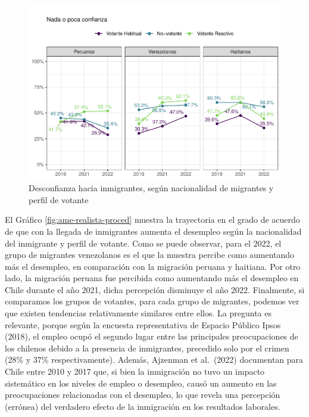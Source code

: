 \documentclass[
  12pt,
]{book}
\begin{document}
\begin{figure}

{\centering \includegraphics{reporte-elsoc_files/figure-latex/desconf-inmigrante-1} 

}

\caption{Desconfianza hacia inmigrantes, según nacionalidad de migrantes y perfil de votante}\label{fig:desconf-inmigrante}
\end{figure}

El Gráfico \ref{fig:ame-realista-proced} muestra la trayectoria en el grado de acuerdo de que con la llegada de inmigrantes aumenta el desempleo según la nacionalidad del inmigrante y perfil de votante. Como se puede observar, para el 2022, el grupo de migrantes venezolanos es el que la muestra percibe como aumentando más el desempleo, en comparación con la migración peruana y haitiana. Por otro lado, la migración peruana fue percibida como aumentando más el desempleo en Chile durante el año 2021, dicha percepción disminuye el año 2022. Finalmente, si comparamos los grupos de votantes, para cada grupo de migrantes, podemos ver que existen tendencias relativamente similares entre ellos. La pregunta es relevante, porque según la encuesta representativa de Espacio Público Ipsos (2018), el empleo ocupó el segundo lugar entre las principales preocupaciones de los chilenos debido a la presencia de inmigrantes, precedido solo por el crimen (28\% y 37\% respectivamente). Además, Ajzenman et al.~(2022) documentan para Chile entre 2010 y 2017 que, si bien la inmigración no tuvo un impacto sistemático en los niveles de empleo o desempleo, causó un aumento en las preocupaciones relacionadas con el desempleo, lo que revela una percepción (errónea) del verdadero efecto de la inmigración en los resultados laborales.
\end{document}
